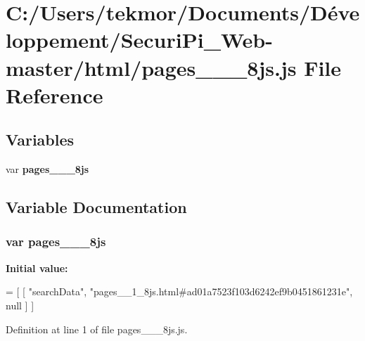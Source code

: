 \section{C\+:/\+Users/tekmor/\+Documents/\+Développement/\+Securi\+Pi\+\_\+\+Web-\/master/html/pages\+\_\+\+\_\+\_\+8js.js File Reference}
\label{pages____1__8js_8js}
\subsection*{Variables}
\begin{DoxyCompactItemize}
\item 
var {\bf pages\+\_\+\+\_\+\_\+8js}
\end{DoxyCompactItemize}


\subsection{Variable Documentation}
\subsubsection[{pages\+\_\+\+\_\+1\+\_\+8js}]{\setlength{\rightskip}{0pt plus 5cm}var pages\+\_\+\+\_\+\_\+8js}\label{pages____1__8js_8js_aeea8ce32034e350074328d8e963634a9}
{\bfseries Initial value\+:}
\begin{DoxyCode}
=
[
    [ \textcolor{stringliteral}{"searchData"}, \textcolor{stringliteral}{"pages\_\_1\_8js.html#ad01a7523f103d6242ef9b0451861231e"}, null ]
]
\end{DoxyCode}


Definition at line 1 of file pages\+\_\+\+\_\+\_\+8js.\+js.

